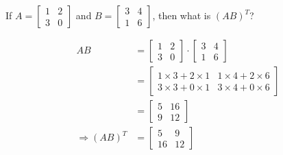 

\question[2] If $A = \left[ \begin{array}{cc} 
1 & 2 \\ 
3 & 0
\end{array}\right]$ and 
$B = \left[ \begin{array}{cc}
3 & 4 \\
1 & 6
\end{array} \right]$, then what is $(AB)^{T}$?


\ifprintanswers
\fi 

\begin{solution}[\halfpage]
	\begin{align}
	   AB &= \left[ \begin{array}{cc} 1 & 2 \\ 3 & 0\end{array} \right]\cdot
	         \left[ \begin{array}{cc} 3 & 4 \\ 1 & 6 \end{array}\right] \\
	      &= \left[ 
	           \begin{array}{cc}
	              1\times 3 + 2\times 1 & 1\times 4 + 2 \times 6 \\
	              3\times 3 + 0\times 1 & 3\times 4 + 0\times 6 
	           \end{array}
	         \right] \\
	      &= \left[
	           \begin{array}{cc}
	               5 & 16 \\
	               9 & 12
	           \end{array}
	         \right] \\
	     \Rightarrow (AB)^{T} &= \left[
	                                \begin{array}{cc}
	                                   5 & 9 \\
	                                   16 & 12 
	                                \end{array}
	                             \right]
	\end{align}
\end{solution}
